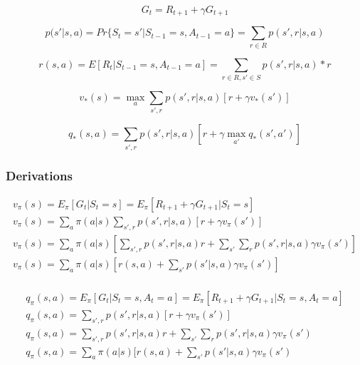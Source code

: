 \documentclass[11pt]{article}
\begin{document}
    \begin{equation}
        G_t = R_{t+1} + \gamma G_{t+1}
    \end{equation}

    \begin{equation}
        p(s'|s,a) = Pr\{S_t=s'|S_{t-1}=s, A_{t-1}=a\} = \sum_{r \in R} p(s', r | s, a)
    \end{equation}

    \begin{equation}
        r(s,a) = E [R_t |S_{t-1}=s, A_{t-1}=a ] = \sum_{r \in R, s' \in S} p(s', r | s, a) * r
    \end{equation}

    \begin{equation}
        v_*(s) = \max_{a} \sum_{s',r} p(s',r| s, a) [r+\gamma v_*(s')]
    \end{equation}

     \begin{equation}
        q_*(s, a) = \sum_{s',r} p(s',r| s, a) [r+\gamma \max_{a'} q_*(s',a')]
    \end{equation}

    \subsubsection*{Derivations}

    \begin{equation}
        \begin{split}
            v_{\pi} (s) = E_{\pi} [G_t | S_t = s] = E_{\pi} [ R_{t+1} + \gamma G_{t+1} | S_t = s] \\
            v_{\pi} (s) = \sum_{a} \pi(a|s) \sum_{s',r} p(s',r|s,a) [r+\gamma v_\pi(s')] \\
            v_{\pi} (s) = \sum_{a} \pi(a|s) [\sum_{s',r} p(s',r|s,a) r + \sum_{s'}\sum_{r} p(s',r|s,a) \gamma v_\pi(s')] \\
            v_{\pi} (s) = \sum_{a} \pi(a|s) [r(s,a) + \sum_{s'} p(s'|s,a) \gamma v_\pi(s')] \\
        \end{split}
    \end{equation}

    \begin{equation}
        \begin{split}
            q_{\pi} (s, a) = E_{\pi} [G_t | S_t = s, A_t = a] = E_{\pi} [ R_{t+1} + \gamma G_{t+1} | S_t = s , A_t = a] \\
            q_{\pi} (s, a) = \sum_{s',r} p(s',r|s,a) [r+\gamma v_\pi(s')] \\
            q_{\pi} (s, a) = \sum_{s',r} p(s',r|s,a) r + \sum_{s'}\sum_{r} p(s',r|s,a) \gamma v_\pi(s') \\
            q_{\pi} (s, a) = \sum_{a} \pi(a|s) [r(s,a) + \sum_{s'} p(s'|s,a) \gamma v_\pi(s') \\
        \end{split}
    \end{equation}
\end{document}
